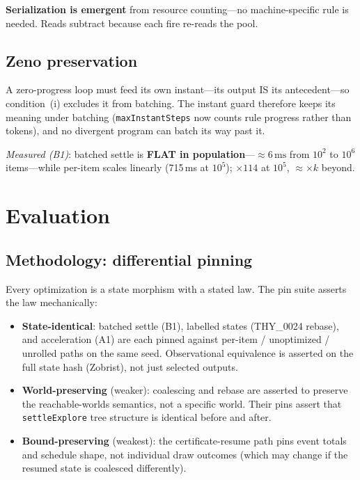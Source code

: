 \documentclass[11pt]{article}
\theoremstyle{remark}
\begin{document}
\textbf{Serialization is emergent} from resource counting---no machine-specific
rule is needed.  Reads subtract because each fire re-reads the pool.

\subsection{Zeno preservation}
\label{sec:zeno}

A zero-progress loop must feed its own instant---its output IS its
antecedent---so condition~(i) excludes it from batching.  The instant guard
therefore keeps its meaning under batching (\texttt{maxInstantSteps} now counts
rule progress rather than tokens), and no divergent program can batch its way past
it.

\textit{Measured (B1)}: batched settle is \textbf{FLAT in population}---$\approx
6\,\text{ms}$ from $10^2$ to $10^6$ items---while per-item scales linearly
(715\,ms at $10^5$); $\times 114$ at $10^5$, $\approx \times k$ beyond.

\section{Evaluation}
\label{sec:evaluation}

\subsection{Methodology: differential pinning}
\label{sec:methodology}

Every optimization is a state morphism with a stated law.  The pin suite asserts
the law mechanically:

\begin{itemize}
\item \textbf{State-identical}: batched settle (B1), labelled states (THY\_0024
  rebase), and acceleration (A1) are each pinned against per-item / unoptimized /
  unrolled paths on the same seed.  Observational equivalence is asserted on the
  full state hash (Zobrist), not just selected outputs.
\item \textbf{World-preserving} (weaker): coalescing and rebase are asserted to
  preserve the reachable-worlds semantics, not a specific world.  Their pins
  assert that \texttt{settleExplore} tree structure is identical before and after.
\item \textbf{Bound-preserving} (weakest): the certificate-resume path pins event
  totals and schedule shape, not individual draw outcomes (which may change if the
  resumed state is coalesced differently).
\end{itemize}
\end{document}
